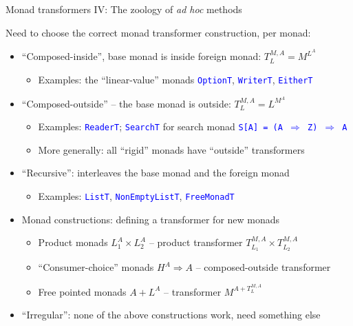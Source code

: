 \documentclass[english]{beamer}
\begin{document}
\begin{frame}{Monad transformers IV: The zoology of \emph{ad hoc} methods}

{\footnotesize{}\vspace{-0.2cm}}Need to choose the correct monad
transformer construction, per monad:
\begin{itemize}
\item ``Composed-inside'', base monad is inside foreign monad: $T_{L}^{M,A}=M^{L^{A}}$
\begin{itemize}
\item Examples: the ``linear-value'' monads \texttt{\textcolor{blue}{\footnotesize{}OptionT}},
\texttt{\textcolor{blue}{\footnotesize{}WriterT}}, \texttt{\textcolor{blue}{\footnotesize{}EitherT}} 
\end{itemize}
\item ``Composed-outside'' -- the base monad is outside: $T_{L}^{M,A}=L^{M^{A}}$
\begin{itemize}
\item Examples: \texttt{\textcolor{blue}{\footnotesize{}ReaderT}}; \texttt{\textcolor{blue}{\footnotesize{}SearchT}}
for search monad \texttt{\textcolor{blue}{\footnotesize{}S{[}A{]}
= (A $\Rightarrow$ Z) $\Rightarrow$ A}} 
\item More generally: all ``rigid'' monads have ``outside'' transformers
\end{itemize}
\item ``Recursive'': interleaves the base monad and the foreign monad
\begin{itemize}
\item Examples: \texttt{\textcolor{blue}{\footnotesize{}ListT}}, \texttt{\textcolor{blue}{\footnotesize{}NonEmptyListT}},
\texttt{\textcolor{blue}{\footnotesize{}FreeMonadT}} 
\end{itemize}
\item Monad constructions: defining a transformer for new monads
\begin{itemize}
\item Product monads $L_{1}^{A}\times L_{2}^{A}$ -- product transformer
$T_{L_{1}}^{M,A}\times T_{L_{2}}^{M,A}$
\item ``Consumer-choice'' monads $H^{A}\Rightarrow A$ -- composed-outside
transformer
\item Free pointed monads $A+L^{A}$ -- transformer $M^{A+T_{L}^{M,A}}$
\end{itemize}
\item ``Irregular'': none of the above constructions work, need something
else
\begin{itemize}

\end{itemize}
\end{itemize}
\end{frame}
\end{document}
